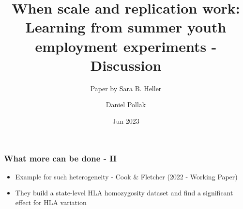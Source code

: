\documentclass{beamer}
\title[Eco B] %
{When scale and replication work: Learning from summer youth
employment experiments - Discussion}
\subtitle{Paper by Sara B. Heller}
\author %
{Daniel Pollak}
\institute[TAU] %
{
  Tel-Aviv University
}
\date{Jun 2023}
\begin{document}

\begin{frame}
\frametitle{What more can be done - II}
\begin{itemize}
\item Example for such heterogeneity - Cook \& Fletcher (2022 - Working Paper)
\item They build a state-level HLA homozygosity dataset and find a significant effect for HLA variation
\end{itemize}
\end{frame}
\end{document}

